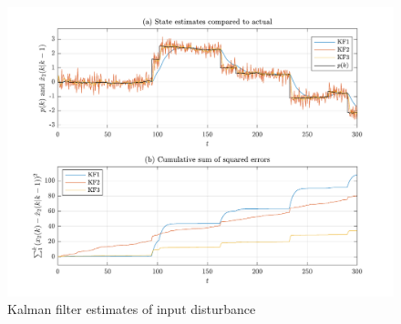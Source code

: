\begin{figure}[htp]
	\centering
	\includegraphics[width=15cm]{images/rod-obs-sim-1-4_est_err.pdf}
	\caption{Kalman filter estimates of input disturbance}
	\label{fig:rod-obs-sim-1-4_est_err}
\end{figure}

